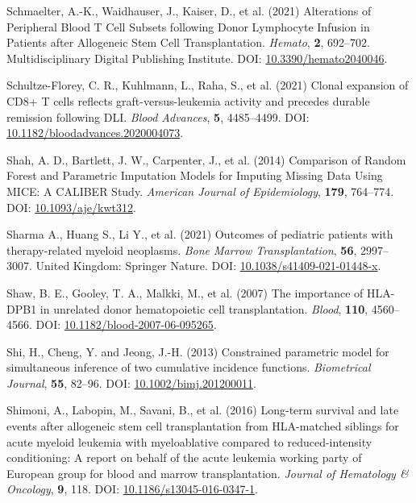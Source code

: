 \documentclass[
  letterpaper,
  DIV=11,
  numbers=noendperiod]{scrreprt}
\newlength{\cslhangindent}
\newlength{\cslentryspacingunit} %
\newenvironment{CSLReferences}[2] %
 {%
  \setlength{\parindent}{0pt}
  \ifodd #1
  \let\oldpar\par
  \def\par{\hangindent=\cslhangindent\oldpar}
  \fi
  \setlength{\parskip}{#2\cslentryspacingunit}
 }%
 {}
\begin{document}
\begin{CSLReferences}{1}{0}
\leavevmode{}%
Schmaelter, A.-K., Waidhauser, J., Kaiser, D., et al. (2021) Alterations
of {Peripheral Blood T Cell Subsets} following {Donor Lymphocyte
Infusion} in {Patients} after {Allogeneic Stem Cell Transplantation}.
\emph{Hemato}, \textbf{2}, 692--702. Multidisciplinary Digital
Publishing Institute. DOI:
\href{https://doi.org/10.3390/hemato2040046}{10.3390/hemato2040046}.

\leavevmode{}%
Schultze-Florey, C. R., Kuhlmann, L., Raha, S., et al. (2021) Clonal
expansion of {CD8}+ {T} cells reflects graft-versus-leukemia activity
and precedes durable remission following {DLI}. \emph{Blood Advances},
\textbf{5}, 4485--4499. DOI:
\href{https://doi.org/10.1182/bloodadvances.2020004073}{10.1182/bloodadvances.2020004073}.

\leavevmode{}%
Shah, A. D., Bartlett, J. W., Carpenter, J., et al. (2014) Comparison of
{Random Forest} and {Parametric Imputation Models} for {Imputing Missing
Data Using MICE}: {A CALIBER Study}. \emph{American Journal of
Epidemiology}, \textbf{179}, 764--774. DOI:
\href{https://doi.org/10.1093/aje/kwt312}{10.1093/aje/kwt312}.

\leavevmode{}%
Sharma A., Huang S., Li Y., et al. (2021) Outcomes of pediatric patients
with therapy-related myeloid neoplasms. \emph{Bone Marrow
Transplantation}, \textbf{56}, 2997--3007. United Kingdom: Springer
Nature. DOI:
\href{https://doi.org/10.1038/s41409-021-01448-x}{10.1038/s41409-021-01448-x}.

\leavevmode{}%
Shaw, B. E., Gooley, T. A., Malkki, M., et al. (2007) The importance of
{HLA-DPB1} in unrelated donor hematopoietic cell transplantation.
\emph{Blood}, \textbf{110}, 4560--4566. DOI:
\href{https://doi.org/10.1182/blood-2007-06-095265}{10.1182/blood-2007-06-095265}.

\leavevmode{}%
Shi, H., Cheng, Y. and Jeong, J.-H. (2013) Constrained parametric model
for simultaneous inference of two cumulative incidence functions.
\emph{Biometrical Journal}, \textbf{55}, 82--96. DOI:
\href{https://doi.org/10.1002/bimj.201200011}{10.1002/bimj.201200011}.

\leavevmode{}%
Shimoni, A., Labopin, M., Savani, B., et al. (2016) Long-term survival
and late events after allogeneic stem cell transplantation from
{HLA-matched} siblings for acute myeloid leukemia with myeloablative
compared to reduced-intensity conditioning: A report on behalf of the
acute leukemia working party of {European} group for blood and marrow
transplantation. \emph{Journal of Hematology \& Oncology}, \textbf{9},
118. DOI:
\href{https://doi.org/10.1186/s13045-016-0347-1}{10.1186/s13045-016-0347-1}.


\end{CSLReferences}
\end{document}
